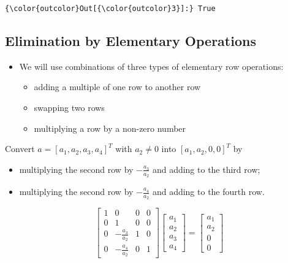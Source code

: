 \documentclass[11pt]{article}
\begin{document}
\begin{Verbatim}[commandchars=\\\{\}]
{\color{outcolor}Out[{\color{outcolor}3}]:} True
\end{Verbatim}
            
    \subsection{Elimination by Elementary
Operations}\label{elimination-by-elementary-operations}

\begin{itemize}
\item
  We will use combinations of three types of elementary row operations:

  \begin{itemize}
  \item
    adding a multiple of one row to another row
  \item
    swapping two rows
  \item
    multiplying a row by a non-zero number
  \end{itemize}
\end{itemize}

Convert \(a=[a_1, a_2, a_3, a_4]^T\) with \(a_2\ne 0\) into
\([a_1, a_2, 0, 0]^T\) by

\begin{itemize}
\item
  multiplying the second row by \(-\frac{a_3}{a_2}\) and adding to the
  third row;
\item
  multiplying the second row by \(-\frac{a_4}{a_2}\) and adding to the
  fourth row.
\end{itemize}

\[\left[\begin{array}{cccc}
1 & 0 & 0 & 0\\
0 & 1 & 0 & 0\\
0 & {-\frac{a_3}{a_2}} & 1 & 0\\
0 & {-\frac{a_4}{a_2}} & 0 & 1
\end{array}\right]
\left[\begin{array}{cccc}
a_1\\
a_2\\
a_3\\
a_4
\end{array}\right]=\left[\begin{array}{cccc}
a_1\\
a_2\\
0\\
0
\end{array}\right]\]
\end{document}
